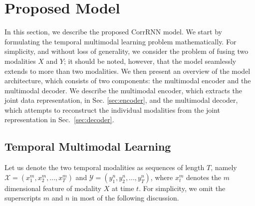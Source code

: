 \documentclass[10pt,twocolumn,letterpaper]{article}
\begin{document}


\section{Proposed Model}
\label{sec:model}
In this section, we describe the proposed CorrRNN model. We start by formulating the temporal multimodal learning problem mathematically. For simplicity, and without loss of generality, we consider the problem of fusing two modalities $X$ and $Y$; it should be noted, however, that the model seamlessly extends to more than two modalities. We then present an overview of the model architecture, which consists of two components: the multimodal encoder and the multimodal decoder. We describe the multimodal encoder, which extracts the joint data representation, in Sec. \ref{sec:encoder}, and the multimodal decoder, which attempts to reconstruct the individual modalities from the joint representation in Sec.~\ref{sec:decoder}.

\subsection{Temporal Multimodal Learning}
Let us denote the two temporal modalities as sequences of length $T$, namely $\mathcal{X}=(x_1^{m},x_2^{m},...,x_T^{m})$ and $\mathcal{Y}=(y_1^{n},y_2^{n},...,y_T^{n})$, where $x_t^{m}$ denotes the $m$ dimensional feature of modality $X$ at time $t$. For simplicity, we omit the superscripts $m$ and $n$ in most of the following discussion.
\end{document}
